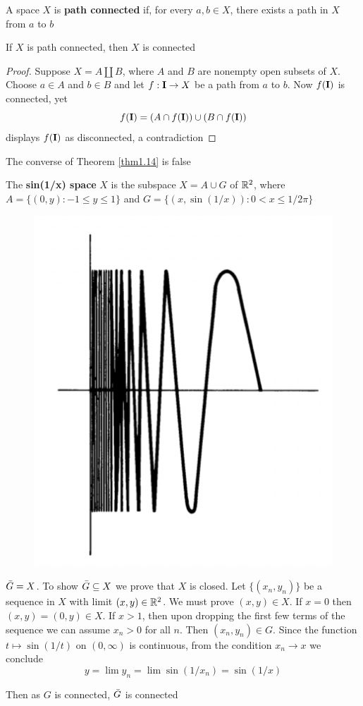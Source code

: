 \documentclass[11pt]{article}
\begin{document}
\begin{definition}[]
A space \(X\) is \textbf{path connected} if, for every \(a,b\in X\), there exists a path in \(X\) from \(a\)
to \(b\)
\end{definition}

\begin{theorem}[]
\label{thm1.14}
If \(X\) is path connected, then \(X\) is connected
\end{theorem}

\begin{proof}
Suppose \(X=A\coprod B\), where \(A\) and \(B\) are nonempty open subsets of \(X\). Choose \(a\in A\)
and \(b\in B\) and let \(f:\operatorname{\textbf{I}}\to X\) be a path from \(a\) to \(b\). Now \(f(\operatorname{\textbf{I}})\) is connected, yet
\begin{equation*}
f(\operatorname{\textbf{I}})=(A\cap f(\operatorname{\textbf{I}}))\cup(B\cap f(\operatorname{\textbf{I}}))
\end{equation*}
displays \(f(\operatorname{\textbf{I}})\) as disconnected, a contradiction
\end{proof}

The converse of Theorem \ref{thm1.14} is false

\begin{examplle}[]
The \textbf{sin(1/x) space} \(X\) is the subspace \(X=A\cup G\) of \(\mathbb{R}^2\), where \(A=\{(0,y):-1\le y\le 1\}\) and
\(G=\{(x,\sin(1/x)):0<x\le 1/2\pi\}\)
\begin{figure}[htbp]
\centering
\includegraphics[width=.4\textwidth]{../images/AnIntroductionToAlgebraicTopology/3.png}
\label{}
\end{figure}

\(\bar{G}=X\). To show \(\bar{G}\subseteq X\) we prove that \(X\) is closed. Let \(\{(x_n,y_n)\}\) be a
sequence in \(X\) with limit \((x,y)\in\mathbb{R}^2\). We must prove \((x,y)\in X\). If \(x=0\)
then \((x,y)=(0,y)\in X\). If \(x>1\), then upon dropping the first few terms of the sequence we
can assume \(x_n>0\) for all \(n\). Then \((x_n,y_n)\in G\). Since the function \(t\mapsto\sin(1/t)\)
on \((0,\infty)\) is continuous, from the condition \(x_n\to x\) we conclude
\begin{equation*}
y=\lim y_n=\lim\sin(1/x_n)=\sin(1/x)
\end{equation*}

Then as \(G\) is connected, \(\bar{G}\) is connected
\end{examplle}
\end{document}

